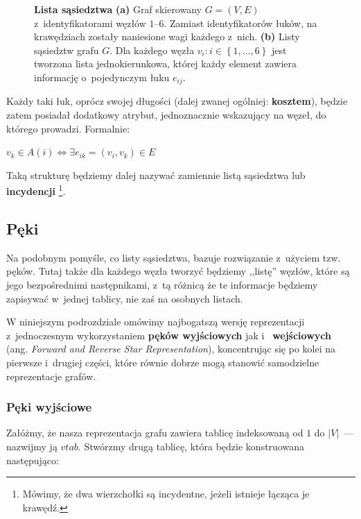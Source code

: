 \begin{figure}[!htbp]
\begin{subfigure}[b]{0.33\textwidth}
		\caption{}
	\end{subfigure}
	\caption{\textbf{Lista sąsiedztwa} \textbf{(a)} Graf skierowany $G = \left( V, E \right)$ z~identyfikatorami węzłów $1$--$6$. Zamiast identyfikatorów łuków, na krawędziach zostały naniesione wagi każdego z~nich. \textbf{(b)} Listy sąsiedztw grafu $G$. Dla każdego węzła $v_{i} : i \in \left\{ 1, \ldots, 6 \right\}$ jest tworzona lista jednokierunkowa, której każdy element zawiera informację o~pojedynczym łuku $e_{ij}$.}\label{fig:adjacencyList}
\end{figure}

Każdy taki łuk, oprócz swojej długości (dalej zwanej ogólniej: \textbf{kosztem}), będzie zatem posiadał dodatkowy atrybut, jednoznacznie wskazujący na węzeł, do którego prowadzi. Formalnie:

$v_{k} \in A \left ( i \right ) \Leftrightarrow \exists e_{ik} = \left( v_{i}, v_{k} \right) \in E $

Taką strukturę będziemy dalej nazywać zamiennie listą sąsiedztwa lub \textbf{incydencji} \footnote{Mówimy, że dwa wierzchołki są incydentne, jeżeli istnieje łącząca je krawędź.}.

\subsection{Pęki}

Na podobnym pomyśle, co listy sąsiedztwa, bazuje rozwiązanie z~użyciem tzw. pęków. Tutaj także dla każdego węzła tworzyć będziemy ,,listę'' węzłów, które są jego bezpośrednimi następnikami, z~tą różnicą że te informacje będziemy zapisywać w~jednej tablicy, nie zaś na osobnych listach.

W niniejszym podrozdziale omówimy najbogatszą wersję reprezentacji z~jednoczesnym wykorzystaniem \textbf{pęków wyjściowych} jak i~\textbf{ wejściowych} (ang. \textit{Forward and Reverse Star Representation}), koncentrując się po kolei na pierwsze i~drugiej części, które równie dobrze mogą stanowić samodzielne reprezentacje grafów.

\subsubsection{Pęki wyjściowe}

Załóżmy, że nasza reprezentacja grafu zawiera tablicę indeksowaną od $1$ do $ \left| V \right| $~---  nazwijmy ją $vtab$. Stwórzmy drugą tablicę, która będzie konstruowana następująco:

